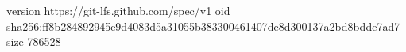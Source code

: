 version https://git-lfs.github.com/spec/v1
oid sha256:ff8b284892945e9d4083d5a31055b383300461407de8d300137a2bd8bdde7ad7
size 786528
